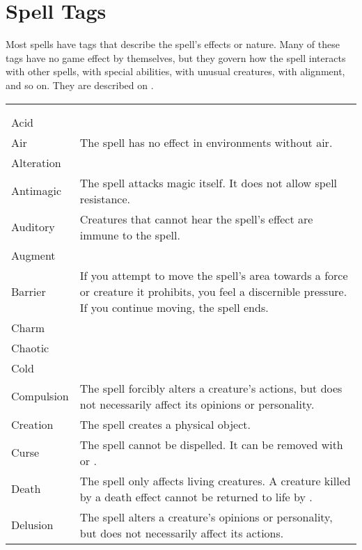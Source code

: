 \section{Spell Tags}\label{Spell Tags}

Most spells have tags that describe the spell's effects or nature. Many of these tags have no game effect by themselves, but they govern how the spell interacts with other spells, with special abilities, with unusual creatures, with alignment, and so on. They are described on .

{
    \onecolumn
    \begin{longtabu}{l X}
         \\
         &  \\
        Acid & \x \\
        Air & The spell has no effect in environments without air. \\
        Alteration & \x \\
        Antimagic & The spell attacks magic itself. It does not allow spell resistance. \\
        Auditory & Creatures that cannot hear the spell's effect are immune to the spell. \\
        Augment & \x \\
        Barrier & If you attempt to move the spell's area towards a force or creature it prohibits, you feel a discernible pressure. If you continue moving, the spell ends. \\
        Charm & \x \\
        Chaotic & \x \\
        Cold & \x \\
        Compulsion & The spell forcibly alters a creature's actions, but does not necessarily affect its opinions or personality. \\
        Creation & The spell creates a physical object. \\
        Curse & The spell cannot be dispelled. It can be removed with  or . \\
        Death & The spell only affects living creatures. A creature killed by a death effect cannot be returned to life by . \\
        Delusion & The spell alters a creature's opinions or personality, but does not necessarily affect its actions. \\

\end{longtabu}}
